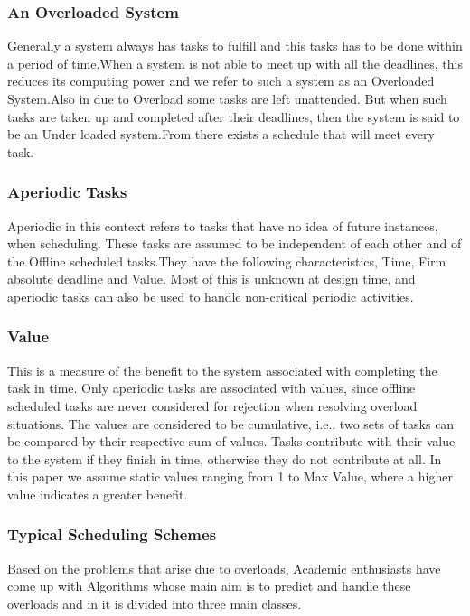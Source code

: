 \documentclass[conference]{IEEEtran}
\begin{document}
\subsubsection{An Overloaded System}
 Generally a system always has tasks to fulfill and this tasks has to be done within a period of time.When a system is not able to meet up with all the deadlines, this reduces its computing power and we refer to such a system as an Overloaded System.Also in due to Overload some tasks are left unattended. But when such tasks are taken up and completed after their deadlines, then the system is said to be an Under loaded system.From  \cite{185354}  there exists a schedule that will meet every task.
 
\subsubsection{Aperiodic Tasks}
Aperiodic in this context refers to tasks that have no idea of future instances, when scheduling. These tasks are assumed to be independent of each other and of the Offline scheduled tasks.They have the following characteristics, Time, Firm absolute deadline and Value. Most of this is unknown at design time, and aperiodic tasks can also be used to handle non-critical periodic activities. \cite{1199244}

\subsubsection{Value}
This is a measure of the benefit to the system associated
with completing the task in time. Only aperiodic tasks are
associated with values, since offline scheduled tasks are
never considered for rejection when resolving overload situations. The values are considered to be cumulative, i.e., two
sets of tasks can be compared by their respective sum of values. Tasks contribute with their value to the system if they
finish in time, otherwise they do not contribute at all. In this
paper we assume static values ranging from 1 to Max Value,
where a higher value indicates a greater benefit.\cite{1199244}


\subsubsection{Typical Scheduling Schemes}
Based on the problems that arise due to overloads, Academic enthusiasts have come up with Algorithms whose main aim is to predict and handle these overloads and in \cite{buttazzo2011hard} it is divided into three main classes.
\end{document}
